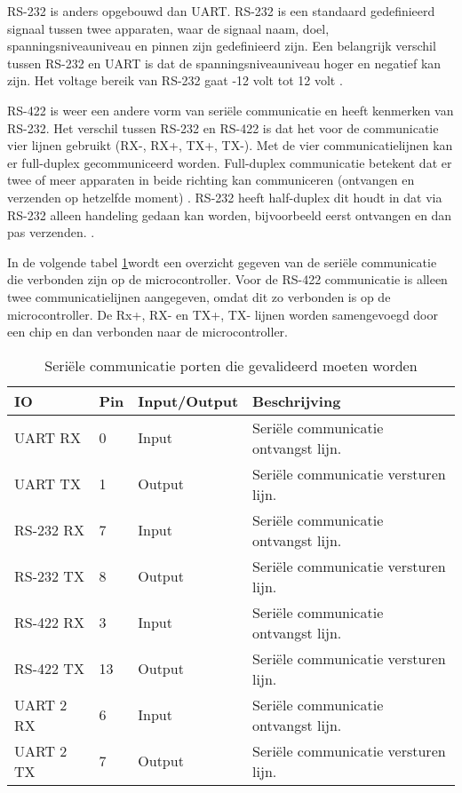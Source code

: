 \noindent RS-232 is anders opgebouwd dan UART. RS-232 is een standaard gedefinieerd signaal tussen twee apparaten, waar de signaal naam, doel, spanningsniveauniveau en pinnen zijn gedefinieerd zijn. Een belangrijk verschil tussen RS-232 en UART is dat de spanningsniveauniveau hoger en negatief kan zijn. Het voltage bereik van RS-232 gaat -12 volt tot 12 volt \autocite{RS232}. \newline

\noindent RS-422 is weer een andere vorm van seriële communicatie en heeft kenmerken van RS-232. Het verschil tussen RS-232 en RS-422 is dat het voor de communicatie vier lijnen gebruikt (RX-, RX+, TX+, TX-). Met de vier communicatielijnen kan er full-duplex gecommuniceerd worden. Full-duplex communicatie betekent dat er twee of meer apparaten in beide richting kan communiceren (ontvangen en verzenden op hetzelfde moment) \autocite{FullDuplex}. RS-232 heeft half-duplex dit houdt in dat via RS-232 alleen handeling gedaan kan worden, bijvoorbeeld eerst ontvangen en dan pas verzenden. \autocite{RS422}. \newline

\noindent In de volgende tabel \ref{tab:hw_val_serieel}wordt een overzicht gegeven van de seriële communicatie die verbonden zijn op de microcontroller. Voor de RS-422 communicatie is alleen twee communicatielijnen aangegeven, omdat dit zo verbonden is op de microcontroller. De Rx+, RX- en TX+, TX- lijnen worden samengevoegd door een chip en dan verbonden naar de microcontroller.
\begin{table}[h!]
	\caption{Seriële communicatie porten die gevalideerd moeten worden}
	\begin{tabular}{lllp{12cm}}
	\toprule
	\textbf{IO} & \textbf{Pin} & \textbf{Input/Output} & \textbf{Beschrijving}	\\ \toprule
	UART RX		& 0    	& Input		& Seriële communicatie ontvangst lijn.			\\
	UART TX		& 1    	& Output	& Seriële communicatie versturen lijn.			\\
	RS-232 RX	& 7    	& Input		& Seriële communicatie ontvangst lijn.			\\
	RS-232 TX	& 8    	& Output	& Seriële communicatie versturen lijn.			\\
	RS-422 RX	& 3    	& Input		& Seriële communicatie ontvangst lijn.			\\
	RS-422 TX	& 13   	& Output	& Seriële communicatie versturen lijn.			\\
	UART 2 RX	& 6    	& Input		& Seriële communicatie ontvangst lijn.			\\
	UART 2 TX	& 7   	& Output	& Seriële communicatie versturen lijn.			\\ \bottomrule
	\end{tabular}
	\label{tab:hw_val_serieel}
\end{table}